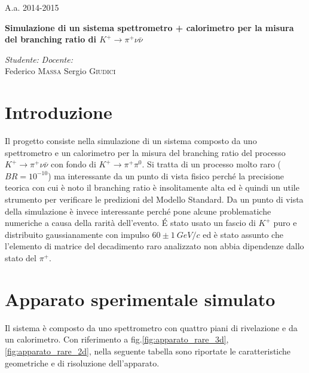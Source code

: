 \documentclass[8pt]{extarticle}
\begin{document}
\Large{A.a. 2014-2015}
\vspace{10cm}
\begin{center}
\Huge\textbf{Simulazione di un sistema spettrometro + calorimetro per la misura del branching ratio di $K^+ \rightarrow \pi^+ \nu \bar{\nu}$}
\end{center}

\vspace{2cm}
\begin{flushleft}
\medskip
\textit{Studente:} 
\hspace{10 cm}
\textit{Docente:} \\
\medskip
Federico \textsc{Massa}
\hspace{9 cm}
Sergio \textsc{Giudici}
\end{flushleft}



\newpage

\begin{abstract}
\justify

\end{abstract}
\bigskip

\doublespacing
\tableofcontents
\singlespacing

\newpage

\section{Introduzione} \label{sec:intro}
\justify
Il progetto consiste nella simulazione di un sistema composto da uno spettrometro e un calorimetro per la misura del branching ratio del processo $K^+ \rightarrow \pi^+ \nu \bar{\nu}$ con fondo di $K^+ \rightarrow \pi^+ \pi^0$. Si tratta di un processo molto raro ($BR = 10^{-10}$) ma interessante da un punto di vista fisico perché la precisione teorica con cui è noto il branching ratio è insolitamente alta ed è quindi un utile strumento per verificare le predizioni del Modello Standard\cite{NA62}. Da un punto di vista della simulazione è invece interessante perché pone alcune problematiche numeriche a causa della rarità dell'evento. \'E stato usato un fascio di $K^+$ puro e distribuito gaussianamente con impulso $60 \pm 1\ GeV/c$ ed è stato assunto che l'elemento di matrice del decadimento raro analizzato non abbia dipendenze dallo stato del $\pi^+$. \\

\section{Apparato sperimentale simulato} \label{sec:apparato}
\justify
Il sistema è composto da uno spettrometro con quattro piani di rivelazione e da un calorimetro. Con riferimento a fig.\ref{fig:apparato_rare_3d}, \ref{fig:apparato_rare_2d}, nella seguente tabella sono riportate le caratteristiche geometriche e di risoluzione dell'apparato. \\
\end{document}

